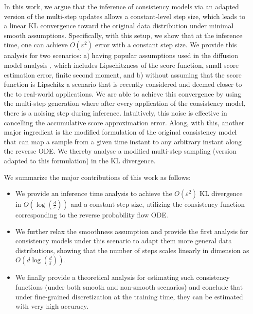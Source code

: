 \documentclass[11pt]{article}
\newcommand{\xh}[1]{\textcolor[HTML]{66CCFF}{#1}}
\begin{document}
In this work, we argue that the inference of consistency models via an adapted version of the multi-step updates allows a constant-level step size, which leads to a linear KL convergence toward the original data distribution under minimal smooth assumptions.
Specifically, {with this setup, we show that at the inference time, one can achieve $O(\varepsilon^2)$ error with a constant step size. We provide this analysis for two scenarios: a) having popular assumptions used in the diffusion model analysis \cite{chen2022sampling,song2020score,xu2024provably,lyu2024sampling}, which includes Lipschitzness of the score function, small score estimation error, finite second moment, and b) without assuming that the score function is Lipschitz \cite{chen2023improved, benton2024nearly}  a scenario that is recently considered and deemed closer to the to real-world applications.} We are able to achieve this convergence by using the multi-step generation where after every application of the consistency model, there is a noising step during inference. Intuitively, this noise is effective in cancelling the accumulative score approximation error. Along, with this, another major ingredient is the modified formulation of the original consistency model that can map a sample from a given time instant to any arbitrary instant along the reverse ODE. We thereby analyse a modified multi-step sampling (version adapted to this formulation) in the KL divergence. 






\noindent
 We summarize the major contributions of this work as follows:


\begin{itemize}
    \item We provide an inference time analysis to achieve the $O(\varepsilon^2)$ KL divergence in $O\left(\log(\frac{d}{\varepsilon})\right)$ and a constant step size, utilizing the consistency function corresponding to the reverse probability flow ODE.
    \item We further relax the smoothness assumption and provide the first analysis for consistency models under this scenario to adapt them more general data distributions, showing that the number of steps scales linearly in dimension as $O\left(d\log(\frac{d}{\varepsilon})\right)$. 
    \item We finally provide a theoretical analysis for estimating such consistency functions (under both smooth and non-smooth scenarios) and conclude that under fine-grained discretization at the training time, they can be estimated with very high accuracy. 
\end{itemize}
\end{document}
